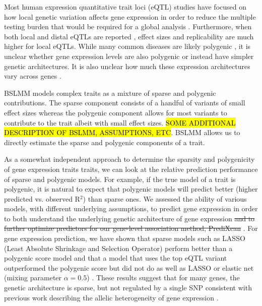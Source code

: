 \documentclass[10pt,letterpaper]{article}
\begin{document}
Most human expression quantitative trait loci (eQTL) studies have focused on how local genetic variation affects gene expression in order to reduce the multiple testing burden that would be required for a global analysis \cite{Albert_2015, Stranger_2012}. Furthermore, when both local and distal eQTLs are reported \cite{Stranger_2007,Innocenti_2011,Wright_2014}, effect sizes and replicability are much higher for local eQTLs. While many common diseases are likely polygenic \cite{Purcell_2009,Stahl_2012,Morris_2012}, it is unclear whether gene expression levels are also polygenic or instead have simpler genetic architectures. It is also unclear how much these expression architectures vary across genes \cite{Albert_2015}. 

BSLMM models complex traits as a mixture of sparse and polygenic contributions. The sparse component consists of a handful of variants of small effect sizes whereas the polygenic component allows for most variants to contribute to the trait albeit with small effect sizes. \hl{SOME ADDITIONAL DESCRIPTION OF BSLMM, ASSUMPTIONS, ETC}. BSLMM allows us to directly estimate the sparse and polygenic components of a trait.

As a somewhat independent approach to determine the sparsity and polygenicity of gene expression traits traits, we can look at the relative prediction performance of sparse and polygenic models. For example, if the true model of a trait is polygenic, it is natural to expect that polygenic models will predict better (higher predicted vs. observed R$^2$) than sparse ones. We assessed the ability of various models, with different underlying assumptions, to predict gene expression in order to both understand the underlying genetic architecture of gene expression \st{and to further optimize predictors for our gene-level association method, PrediXcan} \cite{Gamazon_2015}. For gene expression prediction, we have shown that sparse models such as LASSO (Least Absolute Shrinkage and Selection Operator) perform better than a polygenic score model and that a model that uses the top eQTL variant outperformed the polygenic score but did not do as well as LASSO or elastic net (mixing parameter $\alpha=0.5$) \cite{Gamazon_2015}. These results suggest that for many genes, the genetic architecture is sparse, but not regulated by a single SNP consistent with previous work describing the allelic heterogeneity of gene expression \cite{brown2013integrative,king2014genetic,zhang2011genetic}. 
\end{document}

